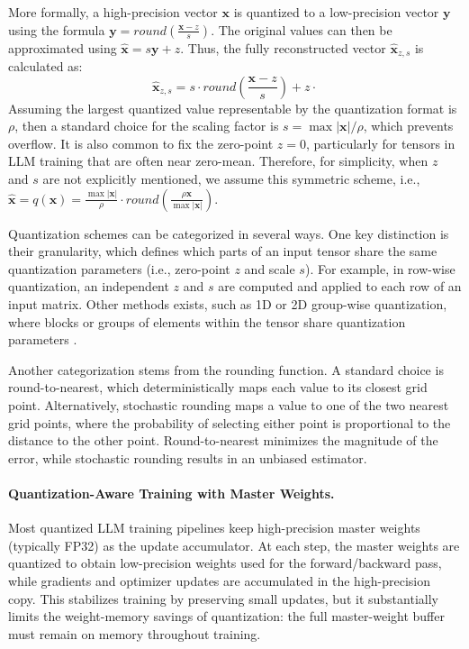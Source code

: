 \documentclass[11pt, a4paper, onecolumn, copyright, goog]{google}
\newcommand{\vect}[1]{\mathbf{#1}}
\newcommand{\vx}{\vect{x}}
\newcommand{\vy}{\vect{y}}
\newcommand{\meq}{\mathbin{=}}
\theoremstyle{plain}
\theoremstyle{definition}
\theoremstyle{remark}
\begin{document}
More formally, a high-precision vector $\vx$ is quantized to a low-precision vector $\vy$ using the formula $\vy \meq \textit{round}(\frac{\vx - z}{s})$. The original values can then be approximated using $\hat{\vx} \meq s \vy + z$. Thus, the fully reconstructed vector $\hat{\vx}_{z,s}$ is calculated as:
\begin{equation}
    \hat{\vx}_{z,s} = s \cdot \textit{round}(\frac{\vx-z}{s}) + z \cdot 
\end{equation}
Assuming the largest quantized value representable by the quantization format is $\rho$, then a standard choice for the scaling factor is $s \meq \max |\vx|/\rho$, which prevents overflow. It is also common to fix the zero-point $z \meq 0$, particularly for tensors in LLM training that are often near zero-mean. Therefore, for simplicity, when $z$ and $s$ are not explicitly mentioned, we assume this symmetric scheme, i.e., $\hat{\vx} \meq q(\vx) \meq \frac{\max{|\vx|}}{\rho} \cdot \textit{round}(\frac{\rho \vx}{\max{|\vx|}})$.

Quantization schemes can be categorized in several ways. One key distinction is their granularity, which defines which parts of an input tensor share the same quantization parameters (i.e., zero-point $z$ and scale $s$). For example, in row-wise quantization, an independent $z$ and $s$ are computed and applied to each row of an input matrix. Other methods exists, such as 1D or 2D group-wise quantization, where blocks or groups of elements within the tensor share quantization parameters \citep{deepseekv3,jetfire,mx}. 

Another categorization stems from the rounding function. A standard choice is round-to-nearest, which deterministically maps each value to its closest grid point. Alternatively, stochastic rounding maps a value to one of the two nearest grid points, where the probability of selecting either point is proportional to the distance to the other point. Round-to-nearest minimizes the magnitude of the error, while stochastic rounding results in an unbiased estimator.

\paragraph{Quantization-Aware Training with Master Weights.}
Most quantized LLM training pipelines keep high-precision master weights (typically FP32) as the update accumulator. At each step, the master weights are quantized to obtain low-precision weights used for the forward/backward pass, while gradients and optimizer updates are accumulated in the high-precision copy. This stabilizes training by preserving small updates, but it substantially limits the weight-memory savings of quantization: the full master-weight buffer must remain on memory throughout training.
\end{document}
